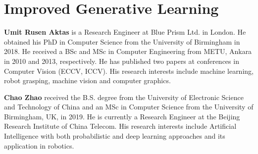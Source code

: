 \documentclass{ws-ijhr}
\begin{document}
 \label{section:generative}

\section{Improved Generative Learning}

 \label{section:generative_new}


\vspace*{-5pt}   %


\eject


\noindent%
\parbox{5truein}{
\begin{minipage}[b]{1truein}
\centerline{{}}
\end{minipage}
\hfill         %
\begin{minipage}[b]{3.85truein}
{{\bf Umit Rusen Aktas} is a Research Engineer at Blue Prism Ltd. in London. He obtained his PhD in Computer Science from the University of Birmingham in 2018. He received a BSc and MSc in Computer Engineering from METU, Ankara in 2010 and 2013, respectively. He has published two papers at conferences in Computer Vision (ECCV, ICCV). His research interests include machine learning, robot grasping, machine vision and computer graphics.\hfilneg}
\end{minipage}} %


\vspace*{13pt}  
\noindent%
\parbox{5truein}{
\begin{minipage}[b]{1truein}
\centerline{{}}
\end{minipage}
\hfill %
\begin{minipage}[b]{3.85truein}
{{\bf Chao Zhao} received the B.S. degree from the University of Electronic Science and Technology of China and an MSc in Computer Science from the University of Birmingham, UK, in 2019. He is currently a Research Engineer at the Beijing Research Institute of China Telecom. His research interests include Artificial Intelligence with both probabilistic and deep learning approaches and its application in robotics.\hfilneg}
\end{minipage}} %
\end{document}
